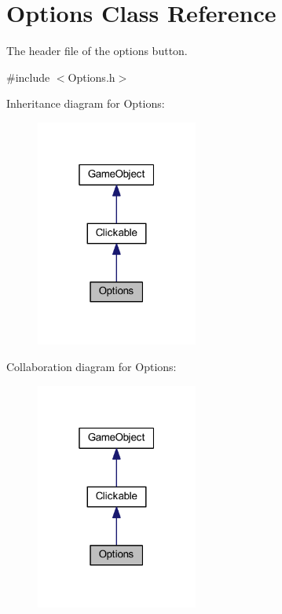 \hypertarget{class_options}{\section{Options Class Reference}
\label{class_options}
}


The header file of the options button.  




{\ttfamily \#include $<$Options.\+h$>$}



Inheritance diagram for Options\+:\nopagebreak
\begin{figure}[H]
\begin{center}
\leavevmode
\includegraphics[width=151pt]{class_options__inherit__graph}
\end{center}
\end{figure}


Collaboration diagram for Options\+:\nopagebreak
\begin{figure}[H]
\begin{center}
\leavevmode
\includegraphics[width=151pt]{class_options__coll__graph}
\end{center}
\end{figure}
